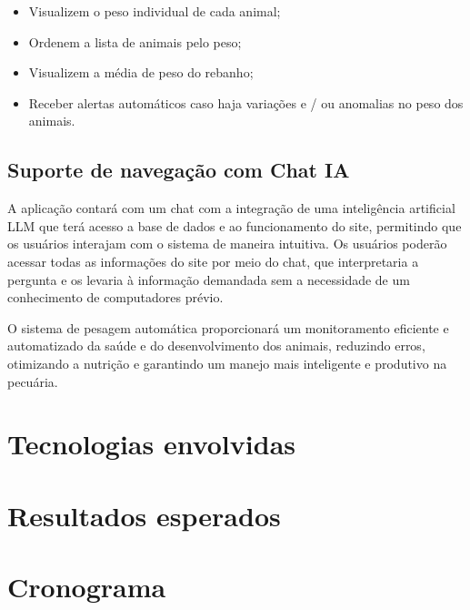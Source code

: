 \documentclass[11pt]{article}
\begin{document}
\begin{itemize}
    \item Visualizem o peso individual de cada animal;
    \item Ordenem a lista de animais pelo peso;
    \item Visualizem a média de peso do rebanho;
    \item Receber alertas automáticos caso haja variações e / ou anomalias no peso dos animais.
\end{itemize}

\subsection{Suporte de navegação com Chat IA}
A aplicação contará com um chat com a integração de uma inteligência artificial LLM que terá acesso a base de dados e ao funcionamento do site, permitindo que os usuários interajam com o sistema de maneira intuitiva. Os usuários poderão acessar todas as informações do site por meio do chat, que interpretaria a pergunta e os levaria à informação demandada sem a necessidade de um conhecimento de computadores prévio.

O sistema de pesagem automática proporcionará um monitoramento eficiente e automatizado da saúde e do desenvolvimento dos animais, reduzindo erros, otimizando a nutrição e garantindo um manejo mais inteligente e produtivo na pecuária.

\section{Tecnologias envolvidas}
\section{Resultados esperados}
\section{Cronograma}



\end{document}
